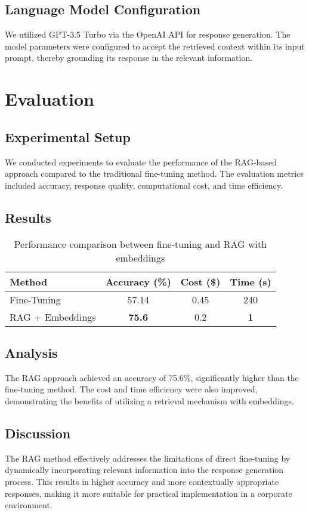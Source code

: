 \documentclass[11pt]{article}
\begin{document}
\subsection{Language Model Configuration}
We utilized GPT-3.5 Turbo via the OpenAI API for response generation. The model parameters were configured to accept the retrieved context within its input prompt, thereby grounding its response in the relevant information.

\section{Evaluation}
\subsection{Experimental Setup}
We conducted experiments to evaluate the performance of the RAG-based approach compared to the traditional fine-tuning method. The evaluation metrics included accuracy, response quality, computational cost, and time efficiency.

\subsection{Results}
\begin{table}[h]
\centering
\begin{tabular}{@{}lccc@{}}
\toprule
\textbf{Method} & \textbf{Accuracy (\%)} & \textbf{Cost (\$)} & \textbf{Time (s)} \\ \midrule
Fine-Tuning & 57.14 & 0.45 & 240 \\
RAG + Embeddings & \textbf{75.6} & 0.2 & \textbf{1} \\ \bottomrule
\end{tabular}
\caption{Performance comparison between fine-tuning and RAG with embeddings}
\label{tab:results}
\end{table}

\subsection{Analysis}
The RAG approach achieved an accuracy of 75.6\%, significantly higher than the fine-tuning method. The cost and time efficiency were also improved, demonstrating the benefits of utilizing a retrieval mechanism with embeddings.

\subsection{Discussion}
The RAG method effectively addresses the limitations of direct fine-tuning by dynamically incorporating relevant information into the response generation process. This results in higher accuracy and more contextually appropriate responses, making it more suitable for practical implementation in a corporate environment.
\end{document}

